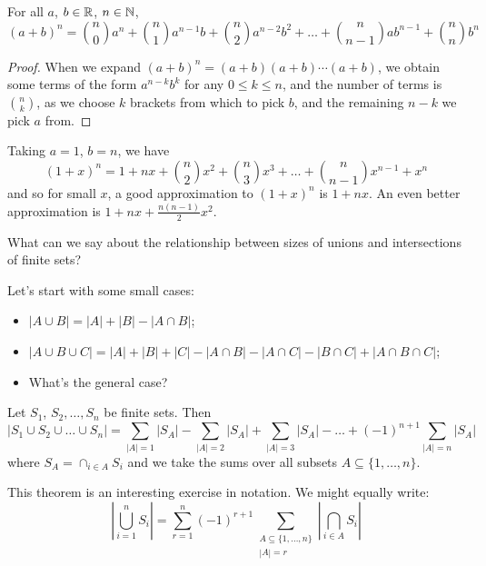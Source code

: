 \documentclass{../template/note}
\begin{document}
    \begin{theorem}
        For all \(a\), \(b \in \mathbb R\), \(n \in \mathbb N\),
        \[
            (a+b)^n = \binom n 0 a^n + \binom n 1 a^{n-1} b + \binom n 2 a^{n-2} b^2 + \dots + \binom n {n-1} ab^{n-1} + \binom n n b^n
        \]
    \end{theorem}
    
    \begin{proof}
        When we expand \((a+b)^n = (a+b)(a+b)\cdots(a+b)\), we obtain some terms of the form \(a^{n-k}b^k\) for any \(0 \leq k \leq n\), and the number of terms is \(\binom n k\), as we choose \(k\) brackets from which to pick \(b\), and the remaining \(n-k\) we pick \(a\) from.
    \end{proof}

    \begin{example}
        Taking \(a = 1\), \(b = n\), we have
        \[
            (1+x)^n = 1 + nx + \binom n 2 x^2 + \binom n 3 x^3 + \dots + \binom n {n-1} x^{n-1} + x^n
        \]
        and so for small \(x\), a good approximation to \((1+x)^n\) is \(1 + nx\). An even better approximation is \(1 + nx + \frac{n(n-1)}{2}x^2\).
    \end{example}
    
    What can we say about the relationship between sizes of unions and intersections of finite sets?

    Let's start with some small cases:
    \begin{itemize}
        \item \(|A \cup B| = |A| + |B| - |A \cap B|\);
        \item \(|A \cup B \cup C| = |A| + |B| + |C| - |A \cap B| - |A \cap C| - |B \cap C| + |A \cap B \cap C|\);
        \item What's the general case?
    \end{itemize}
    
    \begin{theorem}
        Let \(S_1\), \(S_2, \dots, S_n\) be finite sets. Then
        \[
            |S_1 \cup S_2 \cup \dots \cup S_n| = \sum_{|A| = 1}|S_A| - \sum_{|A| = 2} |S_A| + \sum_{|A| = 3} |S_A| - \dots + (-1)^{n+1} \sum_{|A| = n} |S_A|
        \]
        where \(S_A = \cap_{i \in A} S_i\) and we take the sums over all subsets \(A \subseteq \{1, \dots, n\}\).
    \end{theorem}
    
    \begin{remark*}
        This theorem is an interesting exercise in notation. We might equally write:
        \[
            \left|\bigcup_{i=1}^n S_i\right| = \sum_{r=1}^n (-1)^{r+1} \sum_{\substack{A \subseteq \{1, \dots, n\} \\ |A| = r}} \left|\bigcap_{i \in A} S_i \right|
        \]
    \end{remark*}
    
\end{document}
